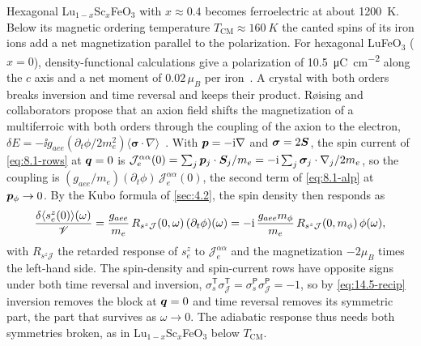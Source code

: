 Hexagonal Lu$_{1-x}$Sc$_x$FeO$_3$ with $x \approx 0.4$ becomes ferroelectric at about \SI{1200}{K}. Below its magnetic ordering temperature $T_{\mathrm{CM}} \approx \SI{160}{K}$ the canted spins of its iron ions add a net magnetization parallel to the polarization. For hexagonal LuFeO$_3$ ($x = 0$), density-functional calculations give a polarization of \SI{10.5}{\micro C.cm^{-2}} along the $c$ axis and a net moment of $0.02\,\mu_B$ per iron~\cite[Sect.~IV\,A]{roising2021axion}. A crystal with both orders breaks inversion and time reversal and keeps their product. R{\o}ising and collaborators propose that an axion field shifts the magnetization of a multiferroic with both orders through the coupling of the axion to the electron, $\delta E = -\ii g_{aee}(\partial_t\phi/2m_e^2)\langle\boldsymbol{\sigma}\cdot\nabla\rangle$~\cite[Eq.~(5)]{roising2021axion}. With $\bm{p} = -\mathrm{i}\nabla$ and $\boldsymbol{\sigma} = 2\bm{S}$, the spin current of \cref{eq:8.1-rows} at $\bm{q} = 0$ is $\mathcal{J}^{\alpha\alpha}_e(0) = \sum_j\bm{p}_j\cdot\bm{S}_j/m_e = -\mathrm{i}\sum_j\boldsymbol{\sigma}_j\cdot\nabla_j/2m_e$, so the coupling is $(g_{aee}/m_e)(\partial_t\phi)\,\mathcal{J}^{\alpha\alpha}_e(0)$, the second term of \cref{eq:8.1-alp} at $\bm{p}_\phi \to 0$. By the Kubo formula of \cref{sec:4.2}, the spin density then responds as
\begin{equation}
  \frac{\delta\langle s^z_e(0)\rangle(\omega)}{\mathscr{V}} = \frac{g_{aee}}{m_e}\,R_{s^z\mathcal{J}}(0,\omega)\,(\partial_t\phi)(\omega) = -\mathrm{i}\,\frac{g_{aee}m_\phi}{m_e}\,R_{s^z\mathcal{J}}(0,m_\phi)\,\phi(\omega) ,
  \label{eq:14.5-cross}
\end{equation}
with $R_{s^z\mathcal{J}}$ the retarded response of $s^z_e$ to $\mathcal{J}^{\alpha\alpha}_e$ and the magnetization $-2\mu_B$ times the left-hand side. The spin-density and spin-current rows have opposite signs under both time reversal and inversion, $\sigma^{\mathsf{T}}_s\sigma^{\mathsf{T}}_{\mathcal{J}} = \sigma^{\mathsf{P}}_s\sigma^{\mathsf{P}}_{\mathcal{J}} = -1$, so by \cref{eq:14.5-recip} inversion removes the block at $\bm{q} = 0$ and time reversal removes its symmetric part, the part that survives as $\omega \to 0$. The adiabatic response thus needs both symmetries broken, as in Lu$_{1-x}$Sc$_x$FeO$_3$ below $T_{\mathrm{CM}}$.

